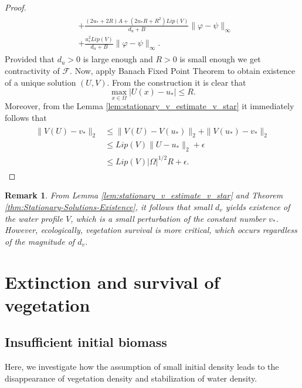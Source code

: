 \documentclass[12pt, a4paper]{article}
\theoremstyle{break}
\theoremstyle{break}
\theoremstyle{break}
\theoremstyle{break}
\newtheorem{rem}{Remark}[section]
\theoremstyle{break}
\theoremstyle{break}
\theoremstyle{break}
\begin{document}
\begin{proof}
\begin{align}
\begin{split}
            &+
            \frac{(2u_* + 2R) A + (2u_*R + R^2) Lip(V)}{d_u + B} \|\varphi - \psi\|_\infty \\
            &+ \frac{u_*^2Lip(V)}{d_u + B}\|\varphi - \psi\|_\infty.
        \end{split}
    \end{align}
    Provided that $d_u > 0$ is large enough and $R > 0$ is small enough we get contractivity of $\mathcal{F}$. Now, apply Banach Fixed Point Theorem to obtain existence of a unique solution $(U, V)$. From the construction it is clear that 
    \begin{equation}
        \max_{x \in \Omega} |U(x) - u_*| \leq R.
    \end{equation}
    Moreover, from the Lemma \ref{lem:stationary_v_estimate_v_star} it immediately follows that
    \begin{align}
        \begin{split}
            \|V(U) - v_*\|_2 
            &\leq \|V(U) - V(u_*)\|_2 + \|V(u_*) - v_*\|_2 \\
            &\leq Lip(V)\|U-u_*\|_2 + \epsilon \\
            &\leq Lip(V)|\Omega|^{1/2} R + \epsilon.     
        \end{split}
    \end{align}
\end{proof}

\begin{rem}
    From Lemma \ref{lem:stationary_v_estimate_v_star} and Theorem \ref{thm:Stationary-Solutions-Existence}, it follows that small $d_v$ yields existence of the water profile $V$, which is a small perturbation of the constant number $v_*$. However, ecologically, vegetation survival is more critical, which occurs regardless of the magnitude of $d_v$. 
\end{rem}

\section{Extinction and survival of vegetation}

\subsection{Insufficient initial biomass} Here, we investigate how the assumption of small initial density leads to the disappearance of vegetation density and stabilization of water density.
\end{document}
